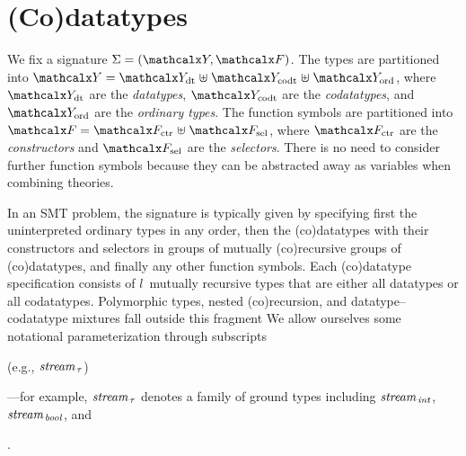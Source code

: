 
\section{%
(Co)datatypes}
\label{sec:the-theory-of-co-datatypes}


We fix a signature $\Sig = (\Types, \Funcs)$. The types are partitioned into
$\Types = \Data \mathrel{\uplus} \Codata \mathrel{\uplus} \Nondata$, where $\Data$ are the
\emph{datatypes}, $\Codata$ are the \emph{codatatypes}, and $\Nondata$ are the %
\emph{ordinary types}. The function symbols are partitioned into $\Funcs = \Ctr
\mathrel{\uplus} \Sel$, where $\Ctr$ are the \emph{constructors} and $\Sel$ are the
\emph{selectors}. There is no need to consider further function symbols
because they can be abstracted away as variables when combining theories.

In an SMT problem, the signature is typically given by specifying first the
uninterpreted ordinary types in any order, then the (co)datatypes with their constructors
and selectors in groups of mutually (co)recursive groups of (co)datatypes, and
finally any other function symbols.
%
Each (co)datatype specification consists of $l$~mutually recursive types that are
either all datatypes or all codatatypes. Polymorphic types, nested
(co)recursion, and datatype--codatatype mixtures fall outside this fragment%
We allow ourselves some notational parameterization
through subscripts%
\begin{conf}
(e.g., $\textit{stream}_{\,\tau}$)%
\end{conf}%
\begin{rep}---for example, $\textit{stream}_{\,\tau}$ denotes a
family of ground types including
$\textit{stream}_{\,\textit{int}}$, $\textit{stream}_{\,\textit{bool}}$,
and \end{rep}.

